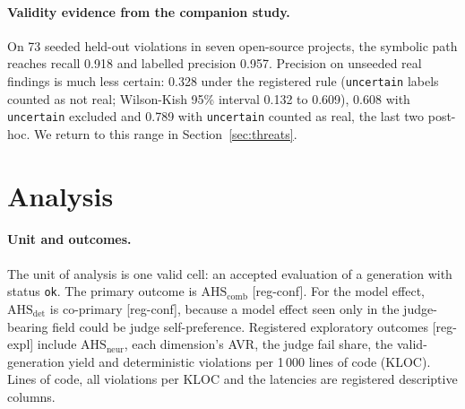 \documentclass[10pt,a4paper]{article}
\newcommand{\regC}{\textsf{\scriptsize[reg-conf]}}  %
\newcommand{\regX}{\textsf{\scriptsize[reg-expl]}}  %
\newcommand{\AHSc}{\mathrm{AHS}_{\mathrm{comb}}}
\newcommand{\AHSd}{\mathrm{AHS}_{\mathrm{det}}}
\newcommand{\AHSn}{\mathrm{AHS}_{\mathrm{neur}}}
\begin{document}
\paragraph{Validity evidence from the companion study.} On 73 seeded held-out violations in seven open-source
projects, the symbolic path reaches recall 0.918 and labelled precision 0.957. %
Precision on unseeded real findings is much less certain: 0.328 under the registered rule (\texttt{uncertain} labels
counted as not real; Wilson-Kish 95\% interval 0.132 to 0.609), 0.608 with \texttt{uncertain} excluded and 0.789
with \texttt{uncertain} counted as real, the last two post-hoc. %
We return to this range in Section~\ref{sec:threats}.

\section{Analysis}\label{sec:analysis}

\paragraph{Unit and outcomes.} The unit of analysis is one valid cell: an accepted evaluation of a generation with
status \texttt{ok}. The primary outcome is $\AHSc$ \regC{}. For the model effect, $\AHSd$ is co-primary \regC{},
because a model effect seen only in the judge-bearing field could be judge self-preference.
Registered exploratory outcomes \regX{} include $\AHSn$, each dimension's AVR, the judge fail share, the valid-generation
yield and deterministic violations per 1\,000 lines of code (KLOC). Lines of code, all violations per KLOC and the
latencies are registered descriptive columns. %
\end{document}

